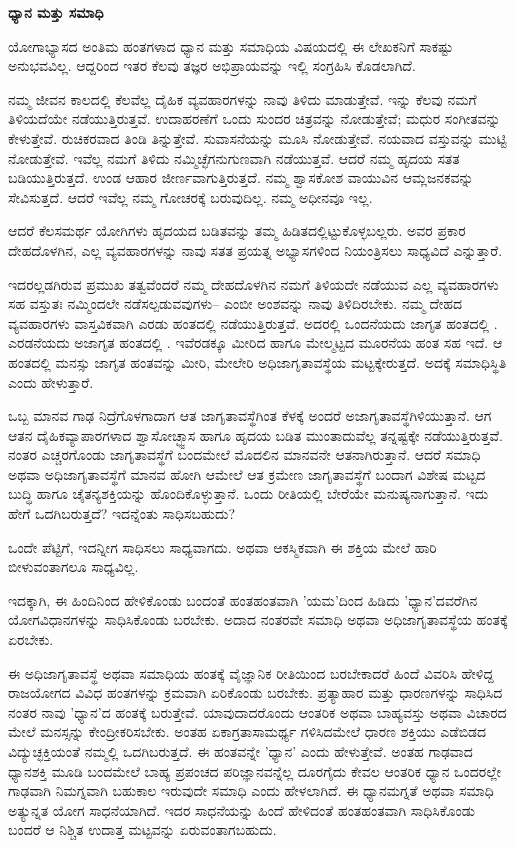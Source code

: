 \textbf{ಧ್ಯಾನ ಮತ್ತು ಸಮಾಧಿ}

ಯೋಗಾಭ್ಯಾಸದ ಅಂತಿಮ ಹಂತಗಳಾದ ಧ್ಯಾನ ಮತ್ತು ಸಮಾಧಿಯ ವಿಷಯದಲ್ಲಿ ಈ ಲೇಖಕನಿಗೆ ಸಾಕಷ್ಟು ಅನುಭವವಿಲ್ಲ. ಆದ್ದರಿಂದ ಇತರ ಕೆಲವು ತಜ್ಞರ ಅಭಿಪ್ರಾಯವನ್ನು ಇಲ್ಲಿ ಸಂಗ್ರಹಿಸಿ ಕೊಡಲಾಗಿದೆ.

ನಮ್ಮ ಜೀವನ ಕಾಲದಲ್ಲಿ ಕೆಲವೆಲ್ಲ ದೈಹಿಕ ವ್ಯವಹಾರಗಳನ್ನು ನಾವು ತಿಳಿದು ಮಾಡುತ್ತೇವೆ. ಇನ್ನು ಕೆಲವು ನಮಗೆ ತಿಳಿಯದೆಯೇ ನಡೆಯುತ್ತಿರುತ್ತವೆ. ಉದಾಹರಣೆಗೆ ಒಂದು ಸುಂದರ ಚಿತ್ರವನ್ನು ನೋಡುತ್ತೇವೆ; ಮಧುರ ಸಂಗೀತವನ್ನು ಕೇಳುತ್ತೇವೆ. ರುಚಿಕರವಾದ ತಿಂಡಿ ತಿನ್ನುತ್ತೇವೆ. ಸುವಾಸನೆಯನ್ನು ಮೂಸಿ ನೋಡುತ್ತೇವೆ. ನಯವಾದ ವಸ್ತುವನ್ನು ಮುಟ್ಟಿ ನೋಡುತ್ತೇವೆ. ಇವೆಲ್ಲ ನಮಗೆ ತಿಳಿದು ನಮ್ಮಿಚ್ಛೆಗನುಗುಣವಾಗಿ ನಡೆಯುತ್ತವೆ. ಆದರೆ ನಮ್ಮ ಹೃದಯ ಸತತ ಬಡಿಯುತ್ತಿರುತ್ತದೆ. ಉಂಡ ಆಹಾರ ಜೀರ್ಣವಾಗುತ್ತಿರುತ್ತದೆ. ನಮ್ಮ ಶ್ವಾಸಕೋಶ ವಾಯುವಿನ ಆಮ್ಲಜನಕವನ್ನು ಸೇವಿಸುತ್ತದೆ. ಆದರೆ ಇವೆಲ್ಲ ನಮ್ಮ ಗೋಚರಕ್ಕೆ ಬರುವುದಿಲ್ಲ. ನಮ್ಮ ಅಧೀನವೂ ಇಲ್ಲ.

ಆದರೆ ಕೆಲಸಮರ್ಥ ಯೋಗಿಗಳು ಹೃದಯದ ಬಡಿತವನ್ನು ತಮ್ಮ ಹಿಡಿತದಲ್ಲಿಟ್ಟುಕೊಳ್ಳಬಲ್ಲರು. ಅವರ ಪ್ರಕಾರ ದೇಹದೊಳಗಿನ, ಎಲ್ಲ ವ್ಯವಹಾರಗಳನ್ನು ನಾವು ಸತತ ಪ್ರಯತ್ನ ಅಭ್ಯಾಸಗಳಿಂದ ನಿಯಂತ್ರಿಸಲು ಸಾಧ್ಯವಿದೆ ಎನ್ನುತ್ತಾರೆ.

ಇದರಲ್ಲಡಗಿರುವ ಪ್ರಮುಖ ತತ್ವವೆಂದರೆ ನಮ್ಮ ದೇಹದೊಳಗಿನ ನಮಗೆ ತಿಳಿಯದೇ ನಡೆಯುವ ಎಲ್ಲ ವ್ಯವಹಾರಗಳು ಸಹ ವಸ್ತುತಃ ನಮ್ಮಿಂದಲೇ ನಡೆಸಲ್ಪಡುವವುಗಳು– ಎಂಬೀ ಅಂಶವನ್ನು ನಾವು ತಿಳಿದಿರಬೇಕು. ನಮ್ಮ ದೇಹದ ವ್ಯವಹಾರಗಳು ವಾಸ್ತವಿಕವಾಗಿ ಎರಡು ಹಂತದಲ್ಲಿ ನಡೆಯುತ್ತಿರುತ್ತವೆ. ಅದರಲ್ಲಿ ಒಂದನೆಯದು ಜಾಗೃತ ಹಂತದಲ್ಲಿ . ಎರಡನೆಯದು ಅಜಾಗೃತ ಹಂತದಲ್ಲಿ . ಇವೆರಡಕ್ಕೂ ಮೀರಿದ ಹಾಗೂ ಮೇಲ್ಮಟ್ಟದ ಮೂರನೆಯ ಹಂತ ಸಹ ಇದೆ. ಆ ಹಂತದಲ್ಲಿ ಮನಸ್ಸು ಜಾಗೃತ ಹಂತವನ್ನು ಮೀರಿ, ಮೇಲೇರಿ ಅಧಿಜಾಗೃತಾವಸ್ಥೆಯ  ಮಟ್ಟಕ್ಕೇರುತ್ತದೆ. ಅದಕ್ಕೆ ಸಮಾಧಿಸ್ಥಿತಿ ಎಂದು ಹೇಳುತ್ತಾರೆ.

ಒಬ್ಬ ಮಾನವ ಗಾಢ ನಿದ್ರೆಗೊಳಗಾದಾಗ ಆತ ಜಾಗೃತಾವಸ್ಥೆಗಿಂತ ಕೆಳಕ್ಕೆ ಅಂದರೆ ಅಜಾಗೃತಾವಸ್ಥೆಗಿಳಿಯುತ್ತಾನೆ. ಆಗ ಆತನ ದೈಹಿಕವ್ಯಾಪಾರಗಳಾದ ಶ್ವಾಸೋಚ್ಛ್ವಾಸ ಹಾಗೂ ಹೃದಯ ಬಡಿತ ಮುಂತಾದುವೆಲ್ಲ ತನ್ನಷ್ಟಕ್ಕೇ ನಡೆಯುತ್ತಿರುತ್ತವೆ. ನಂತರ ಎಚ್ಚರಗೊಂಡು ಜಾಗೃತಾವಸ್ಥೆಗೆ ಬಂದಮೇಲೆ ಮೊದಲಿನ ಮಾನವನೇ ಆತನಾಗಿರುತ್ತಾನೆ. ಆದರೆ ಸಮಾಧಿ ಅಥವಾ ಅಧಿಜಾಗೃತಾವಸ್ಥೆಗೆ ಮಾನವ ಹೋಗಿ ಆಮೇಲೆ ಆತ ಕ್ರಮೇಣ ಜಾಗೃತಾವಸ್ಥೆಗೆ ಬಂದಾಗ ವಿಶೇಷ ಮಟ್ಟದ ಬುದ್ಧಿ ಹಾಗೂ ಚೈತನ್ಯಶಕ್ತಿಯನ್ನು ಹೊಂದಿಕೊಳ್ಳುತ್ತಾನೆ. ಒಂದು ರೀತಿಯಲ್ಲಿ ಬೇರೆಯೇ ಮನುಷ್ಯನಾಗುತ್ತಾನೆ. ಇದು ಹೇಗೆ ಒದಗಿಬರುತ್ತದೆ? ಇದನ್ನೆಂತು ಸಾಧಿಸಬಹುದು?

ಒಂದೇ ಪೆಟ್ಟಿಗೆ, ಇದನ್ನೀಗ ಸಾಧಿಸಲು ಸಾಧ್ಯವಾಗದು. ಅಥವಾ ಆಕಸ್ಮಿಕವಾಗಿ ಈ ಶಕ್ತಿಯ ಮೇಲೆ ಹಾರಿ ಬೀಳುವಂತಾಗಲೂ ಸಾಧ್ಯವಿಲ್ಲ.

ಇದಕ್ಕಾಗಿ, ಈ ಹಿಂದಿನಿಂದ ಹೇಳಿಕೊಂಡು ಬಂದಂತೆ ಹಂತಹಂತವಾಗಿ 'ಯಮ'ದಿಂದ ಹಿಡಿದು 'ಧ್ಯಾನ'ದವರೆಗಿನ ಯೋಗವಿಧಾನಗಳನ್ನು ಸಾಧಿಸಿಕೊಂಡು ಬರಬೇಕು. ಅದಾದ ನಂತರವೇ ಸಮಾಧಿ ಅಥವಾ ಅಧಿಜಾಗೃತಾವಸ್ಥೆಯ ಹಂತಕ್ಕೆ ಏರಬೇಕು.

ಈ ಅಧಿಜಾಗೃತಾವಸ್ಥೆ ಅಥವಾ ಸಮಾಧಿಯ ಹಂತಕ್ಕೆ ವೈಜ್ಞಾನಿಕ ರೀತಿಯಿಂದ ಬರಬೇಕಾದರೆ ಹಿಂದೆ ವಿವರಿಸಿ ಹೇಳಿದ್ದ ರಾಜಯೋಗದ ವಿವಿಧ ಹಂತಗಳನ್ನು ಕ್ರಮವಾಗಿ ಏರಿಕೊಂಡು ಬರಬೇಕು. ಪ್ರತ್ಯಾಹಾರ ಮತ್ತು ಧಾರಣಗಳನ್ನು ಸಾಧಿಸಿದ ನಂತರ ನಾವು 'ಧ್ಯಾನ'ದ ಹಂತಕ್ಕೆ ಬರುತ್ತೇವೆ. ಯಾವುದಾದರೊಂದು ಆಂತರಿಕ ಅಥವಾ ಬಾಹ್ಯವಸ್ತು ಅಥವಾ ವಿಚಾರದ ಮೇಲೆ ಮನಸ್ಸನ್ನು ಕೇಂದ್ರೀಕರಿಸಬೇಕು. ಅಂತಹ ಏಕಾಗ್ರತಾಸಾಮರ್ಥ್ಯ ಗಳಿಸಿದಮೇಲೆ ಧಾರಣ ಶಕ್ತಿಯು ಎಡೆಬಿಡದ ವಿದ್ಯುಚ್ಛಕ್ತಿಯಂತೆ ನಮ್ಮಲ್ಲಿ ಒದಗಿಬರುತ್ತದೆ. ಈ ಹಂತವನ್ನೇ 'ಧ್ಯಾನ' ಎಂದು ಹೇಳುತ್ತೇವೆ. ಅಂತಹ ಗಾಢವಾದ ಧ್ಯಾನಶಕ್ತಿ ಮೂಡಿ ಬಂದಮೇಲೆ ಬಾಹ್ಯ ಪ್ರಪಂಚದ ಪರಿಜ್ಞಾನವನ್ನೆಲ್ಲ ದೂರಗೈದು ಕೇವಲ ಆಂತರಿಕ ಧ್ಯಾನ ಒಂದರಲ್ಲೇ ಗಾಢವಾಗಿ ನಿಮಗ್ನವಾಗಿ ಬಹುಕಾಲ ಇರುವುದೇ ಸಮಾಧಿ ಎಂದು ಹೇಳಲಾಗಿದೆ. ಈ ಧ್ಯಾನಮಗ್ನತೆ ಅಥವಾ ಸಮಾಧಿ ಅತ್ಯುನ್ನತ ಯೋಗ ಸಾಧನೆಯಾಗಿದೆ. ಇದರ ಸಾಧನೆಯನ್ನು ಹಿಂದೆ ಹೇಳಿದಂತೆ ಹಂತಹಂತವಾಗಿ ಸಾಧಿಸಿಕೊಂಡು ಬಂದರೆ ಆ ನಿಶ್ಚಿತ ಉದಾತ್ತ ಮಟ್ಟವನ್ನು ಏರುವಂತಾಗಬಹುದು.

